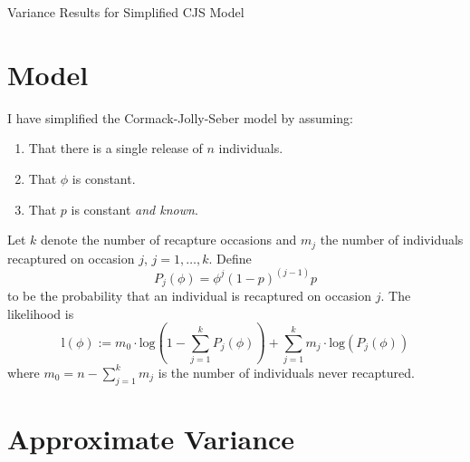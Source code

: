 \documentclass[12pt]{article}
\begin{document}
\begin{center}
  {\Large Variance Results for Simplified CJS Model}
\end{center}

\section{Model}

I have simplified the Cormack-Jolly-Seber model by assuming:
\begin{enumerate}
\item That there is a single release of $n$ individuals.
\item That $\phi$ is constant.
\item That $p$ is constant \textit{and known}.
\end{enumerate}
Let $k$ denote the number of recapture occasions and $m_j$ the number of individuals recaptured on occasion $j$, $j=1,\ldots,k$. Define
\[
P_j(\phi)=\phi^j(1-p)^{(j-1)}p
\]
to be the probability that an individual is recaptured on occasion $j$. The likelihood is
\[ 
\mathrm{l}\left( \phi\right) :={{m}_{0}}\cdot \mathrm{log}\left( 1-\sum_{j=1}^{k}{{P}_{j}}\left( \phi\right) \right) +\sum_{j=1}^{k}{{m}_{j}}\cdot \mathrm{log}\left( {{P}_{j}}\left( \phi\right) \right) \mbox{}
\]
where $m_0=n-\sum_{j=1}^k m_j$ is the number of individuals never recaptured. 

\section{Approximate Variance}
\end{document}
